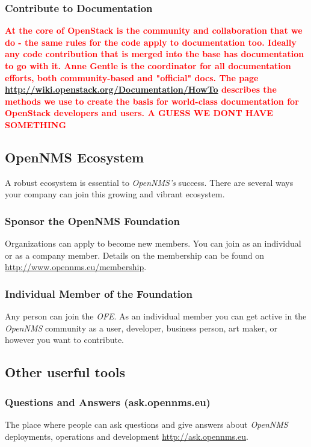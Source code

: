 \subsubsection{Contribute to Documentation}
\textbf{\textcolor{red}{At the core of OpenStack is the community and collaboration that we do - the same rules for the code apply to documentation too. Ideally any code contribution that is merged into the base has documentation to go with it. Anne Gentle is the coordinator for all documentation efforts, both community-based and "official" docs. The page \url{http://wiki.openstack.org/Documentation/HowTo} describes the methods we use to create the basis for world-class documentation for OpenStack developers and users. A GUESS WE DONT HAVE SOMETHING}}

\subsection{OpenNMS Ecosystem}
A robust ecosystem is essential to \emph{OpenNMS’s} success. There are several ways your company can join this growing and vibrant ecosystem.

\subsubsection{Sponsor the OpenNMS Foundation}
Organizations can apply to become new members. You can join as an individual or as a company member. Details on the membership can be found on \url{http://www.opennms.eu/membership}.

\subsubsection{Individual Member of the Foundation}
Any person can join the \emph{OFE}. As an individual member you can get active in the \emph{OpenNMS} community as a user, developer, business person, art maker, or however you want to contribute.


\subsection{Other userful tools}

\subsubsection{Questions and Answers (ask.opennms.eu)}
The place where people can ask questions and give answers about \emph{OpenNMS} deployments, operations and development \url{http://ask.opennms.eu}.

